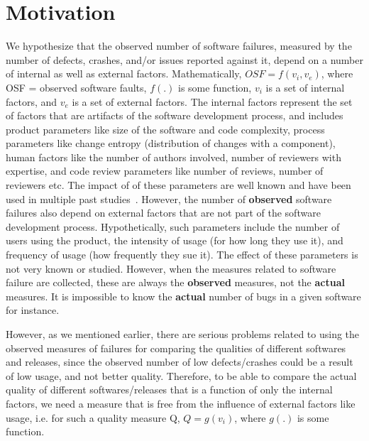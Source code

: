 \documentclass[smallcondensed]{svjour3}     %
\begin{document}
\vspace{-10pt}
\section{Motivation}\label{s:motiv}

We hypothesize that the observed number of software failures, measured by the number of defects, crashes, and/or issues reported against it, depend on a number of internal as well as external factors. Mathematically,
$ OSF = f(v_i, v_e) $, where OSF = observed software faults, $f(.)$ is some function, $v_i$ is a set of internal factors, and $v_e$ is a set of external factors. The internal factors represent the set of factors that are artifacts of the software development process, and includes product parameters like size of the software and code complexity, process parameters like change entropy (distribution of changes with a component), human factors like the number of authors involved, number of reviewers with expertise, and code review parameters like number of reviews, number of reviewers etc. The impact of of these parameters are well known and have been used in multiple past studies~\cite{mcintosh2015emse,mcintosh2014impact,rigby2013convergent,kononenko2015investigating}. However, the number of \textbf{observed} software failures also depend on external factors that are not part of the software development process. Hypothetically, such parameters include the number of users using the product, the intensity of usage (for how long they use it), and frequency of usage (how frequently they sue it). The effect of these parameters is not very known or studied. However, when the measures related to software failure are collected, these are always the \textbf{observed} measures, not the \textbf{actual} measures. It is impossible to know the \textbf{actual} number of bugs in a given software for instance. 

However, as we mentioned earlier, there are serious problems related to using the observed measures of failures for comparing the qualities of different softwares and releases, since the observed number of low defects/crashes could be a result of low usage, and not better quality. Therefore, to be able to compare the actual quality of different softwares/releases that is a function of only the internal factors, we need a measure that is free from the influence of external factors like usage, i.e. for such a quality measure Q, $Q = g(v_i)$, where $g(.)$ is some function.
\end{document}
